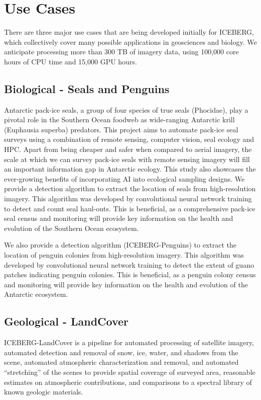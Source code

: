 \documentclass[manuscript,screen]{acmart}
\begin{document}
\section[cases]{Use Cases}
\label{sec:cases}
There are three major use cases that are being developed initially for ICEBERG, which collectively cover many possible applications in geosciences and biology.  We anticipate processing more than 300 TB of imagery data, using 100,000 core hours of CPU time and 15,000 GPU hours.
\subsection{Biological - Seals and Penguins}
Antarctic pack-ice seals, a group of four species of true seals (Phocidae), play a pivotal role in the Southern Ocean foodweb as wide-ranging Antarctic krill (Euphausia superba) predators. This project aims to automate pack-ice seal surveys using a combination of remote sensing, computer vision, seal ecology and HPC. Apart from being cheaper and safer when compared to aerial imagery, the scale at which we can survey pack-ice seals with remote sensing imagery will fill an important information gap in Antarctic ecology. This study also showcases the ever-growing benefits of incorporating AI into ecological sampling designs. We provide a detection algorithm to extract the location of seals from high-resolution imagery. This algorithm was developed by convolutional neural network training to detect and count seal haul-outs. This is beneficial, as a comprehensive pack-ice seal census and monitoring will provide key information on the health and evolution of the Southern Ocean ecosystem.

We also provide a detection algorithm (ICEBERG-Penguins) to extract the location of penguin colonies from high-resolution imagery. This algorithm was developed by convolutional neural network training to detect the extent of guano patches indicating penguin colonies. This is beneficial, as a penguin colony census and monitoring will provide key information on the health and evolution of the Antarctic ecosystem. 

\subsection{Geological - LandCover}
ICEBERG-LandCover is a pipeline for automated processing of satellite imagery, automated detection and removal of snow, ice, water, and shadows from the scene, automated atmospheric characterization and removal, and automated “stretching'' of the scenes to provide spatial coverage of surveyed area, reasonable estimates on atmospheric contributions, and comparisons to a spectral library of known geologic materials. 
\end{document}
